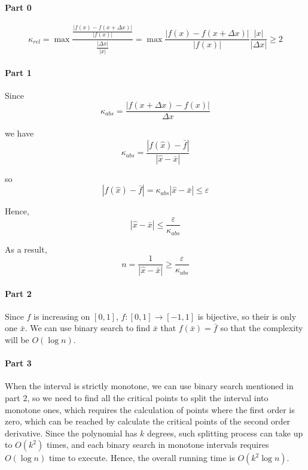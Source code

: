 \documentclass[11pt]{article}
\begin{document}
	\paragraph{Part 0}
		\[\kappa_{rel} = \max\frac{\frac{|f(x) - f(x + \Delta x)|}{|f(x)|}}{\frac{|\Delta x|}{|x|}} = \max\frac{|f(x) - f(x + \Delta x)|}{|f(x)|}\frac{|x|}{|\Delta x|} \geq 2\]
	\paragraph{Part 1}
		Since \[\kappa_{abs} = \frac{|f(x + \Delta x) - f(x)|}{\Delta x}\]
		
		we have \[\kappa_{abs} = \frac{|f(\hat{x}) - \bar{f}|}{|\hat{x} - \bar{x}|}\]
		
		so
			\[|f(\hat{x}) - \bar{f}| = \kappa_{abs}|\hat{x} - \bar{x}| \leq \varepsilon \]
			
	 	Hence, \[|\hat{x} - \bar{x}| \leq \frac{\varepsilon}{\kappa_{abs}}\]
	 	
	 	As a result, \[n = \frac{1}{|\hat{x} - \bar{x}|} \geq \frac{\varepsilon}{\kappa_{abs}}\]
	\paragraph{Part 2}
		Since $f$ is increasing on $[0, 1]$, $f: [0, 1] \rightarrow [-1, 1]$ is bijective, so their is only one $\bar{x}$. We can use binary search to find $\bar{x}$ that $f(\bar{x}) = \bar{f}$ so that the complexity will be $O(\log n)$.
	\paragraph{Part 3}
		When the interval is strictly monotone, we can use binary search mentioned in part 2, so we need to find all the critical points to split the interval into monotone ones, which requires the calculation of points where the first order is zero, which can be reached by calculate the critical points of the second order derivative. Since the polynomial has $k$ degrees, such splitting process can take up to $O(k^2)$ times, and each binary search in monotone intervals requires $O(\log n)$ time to execute. Hence, the overall running time is $O(k^2 \log n)$. 
\end{document}
